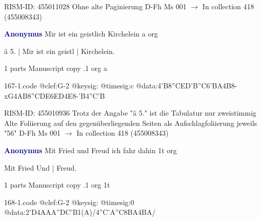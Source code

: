 \documentclass[twocolumn]{book}
\begin{document}
\newline RISM-ID: 455011028
\newline Ohne alte Paginierung
\newline D-Fh  Ms 001
\newline $\rightarrow$ In collection 418 (455008343)

\newline \par \vspace{7pt} \textcolor{darkblue}{\textbf{Anonymus  }}
\newline Mir ist ein geistlich Kirchelein  a  
\newline org
\newline \begin{itshape}[f.65v, at left:] â 5. | Mir ist ein geistl | Kirchelein.\end{itshape} 
\newline \textcolor{darkblue}{}  1 parts  
\newline Manuscript copy
.1  org  a  
\begin{filecontents*}{167-1.code}
@clef:G-2
@keysig:
@timesig:c
@data:4'B{8''CE}{D'B''C6'BA}4B8-xG4AB{8''CDE6ED}4E8-'B4''C'B
\end{filecontents*}
\newline
%

\newline RISM-ID: 455010936
\newline Trotz der Angabe "â 5." ist die Tabulatur nur zweistimmig
\newline Alte Foliierung auf den gegenüberliegenden Seiten als Aufschlagfoliierung jeweils "56"
\newline D-Fh  Ms 001
\newline $\rightarrow$ In collection 418 (455008343)

\newline \par \vspace{7pt} \textcolor{darkblue}{\textbf{Anonymus  }}
\newline Mit Fried und Freud ich fahr dahin  1t  
\newline org
\newline \begin{itshape}[f.25v, at left:] Mit Fried Und | Freud.\end{itshape} 
\newline \textcolor{darkblue}{}  1 parts  
\newline Manuscript copy
.1  org  1t  
\begin{filecontents*}{168-1.code}
@clef:G-2
@keysig:
@timesig:0
@data:2'D4AAA''DC'B1(A)/4''C'A''C{8BA}4BA/
\end{filecontents*}
\newline
%
\end{document}
